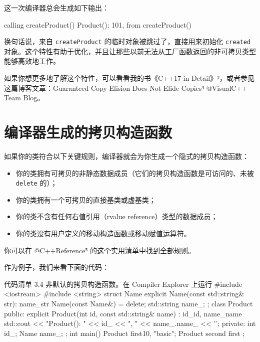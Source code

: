 这一次编译器总会生成如下输出：

\begin{codebox}[cpp]
calling createProduct()
Product(): 101, from createProduct()
\end{codebox}

换句话说，来自 \texttt{createProduct} 的临时对象被跳过了，直接用来初始化 \texttt{created} 对象。这个特性有助于优化，并且让那些以前无法从工厂函数返回的非可拷贝类型能够高效地工作。

如果你想更多地了解这个特性，可以看看我的书《C++17 in Detail》³，或者参见这篇博客文章：Guaranteed Copy Elision Does Not Elide Copies⁴ @VisualC++ Team Blog。


\section{编译器生成的拷贝构造函数}

如果你的类符合以下关键规则，编译器就会为你生成一个隐式的拷贝构造函数：

\begin{itemize}
\item 你的类拥有可拷贝的非静态数据成员（它们的拷贝构造函数是可访问的、未被 \texttt{delete} 的）；
\item 你的类拥有一个可拷贝的直接基类或虚基类；
\item 你的类不含有任何右值引用（rvalue reference）类型的数据成员；
\item 你的类没有用户定义的移动构造函数或移动赋值运算符。
\end{itemize}

你可以在 @C++Reference⁵ 的这个实用清单中找到全部规则。


作为例子，我们来看下面的代码：

\begin{codeboxt}[cpp]{代码清单 3.4 非默认的拷贝构造函数。在 Compiler Explorer 上运行}
#include <iostream>
#include <string>
struct Name {
explicit Name(const std::string& str): name_{str} { }
Name(const Name&) = delete;
std::string name_;
};
class Product {
public:
explicit Product(int id, const std::string& name)
: id_{id}, name_{name} {
std::cout << "Product(): " << id_ << ", " << name_.name_ << '\n';
}
private:
int id_;
Name name_;
};
int main() {
Product first{10, "basic"};
Product second { first };
}
\end{codeboxt}

